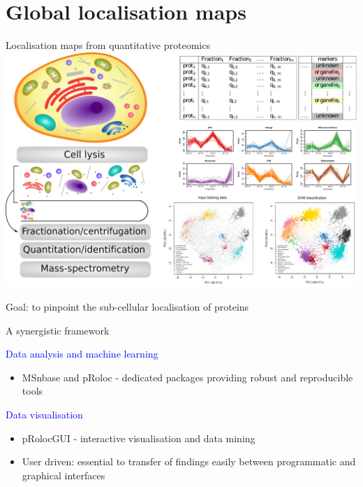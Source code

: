 \documentclass[bigger]{beamer}
\begin{document}

\section{Global localisation maps}

\begin{frame}{Localisation maps from quantitative proteomics}
\bigskip
      \includegraphics[width=1\linewidth]{Figures/lopit-new.pdf}
       \begin{center}
       \footnotesize{Goal: to pinpoint the sub-cellular localisation of proteins}
       \end{center}

\end{frame}





\begin{frame}{A synergistic framework}
  \begin{block} \large \textcolor{Blue}{Data analysis and machine learning}
  \begin{itemize}
  \item MSnbase and pRoloc - dedicated packages providing robust
  and reproducible tools
   \end{itemize}
  \end{block}

  \begin{block} \large \textcolor{Blue}{Data visualisation}
    \begin{itemize}
    \item pRolocGUI - interactive visualisation and data mining
    \item User driven: essential to transfer of findings easily between
    programmatic and graphical interfaces
    \end{itemize}
  \end{block}
\end{frame}
\end{document}
